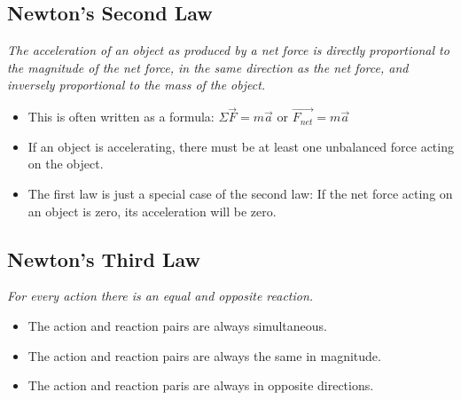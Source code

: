 \documentclass[letterpaper, 12pt]{article}
\begin{document}
\subsection*{Newton's Second Law}
\begin{center}
	\textit{The acceleration of an object as produced by a net force is directly proportional to the magnitude of the net force, in the same direction as the net force, and inversely proportional to the mass of the object.}
\end{center}
	\begin{itemize}
	\item This is often written as a formula: $ \Sigma\vec{F} = m \vec{a}$ or $ \vec{F_{net}} = m \vec{a}$
	\item If an object is accelerating, there must be at least one unbalanced force acting on the object. 
	\item The first law is just a special case of the second law: If the net force acting on an object is zero, its acceleration will be zero. 
\end{itemize}





 

\subsection*{Newton's Third Law}
\begin{center}
	\textit{For every action there is an equal and opposite reaction.}
\end{center}
\begin{itemize}
	\item The action and reaction pairs are always simultaneous.
	\item The action and reaction pairs are always the same in magnitude.
	\item The action and reaction paris are always in opposite directions.
	
\end{itemize}


 
 
\end{document}
